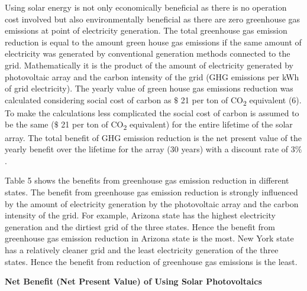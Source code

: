 \documentclass[12pt]{article}
\begin{document}


\vspace{\baselineskip}
\begin{justify}
Using solar energy is not only economically beneficial as there is no operation cost involved but also environmentally beneficial as there are zero greenhouse gas emissions at point of electricity generation. The total greenhouse gas emission reduction is equal to the amount green house gas emissions if the same amount of electricity was generated by conventional generation methods connected to the grid. Mathematically it is the product of the amount of electricity generated by photovoltaic array and the carbon intensity of the grid (GHG emissions per kWh of grid electricity). The yearly value of green house gas emissions reduction was calculated considering social cost of carbon as $\$$ 21 per ton of CO\textsubscript{2 }equivalent (6). To make the calculations less complicated the social cost of carbon is assumed to be the same ($\$$ 21 per ton of CO\textsubscript{2 }equivalent) for the entire lifetime of the solar array. The total benefit of GHG emission reduction is the net present value of the yearly benefit over the lifetime for the array (30 years) with a discount rate of 3$\%$ .
\end{justify}\par


\vspace{\baselineskip}
\begin{justify}
Table 5 shows the benefits from greenhouse gas emission reduction in different states. The benefit from greenhouse gas emission reduction is strongly influenced by the amount of electricity generation by the photovoltaic array and the carbon intensity of the grid. For example, Arizona state has the highest electricity generation and the dirtiest grid of the three states. Hence the benefit from greenhouse gas emission reduction in Arizona state is the most. New York state has a relatively cleaner grid and the least electricity generation of the three states. Hence the benefit from reduction of greenhouse gas emissions is the least.
\end{justify}\par


\vspace{\baselineskip}
\begin{justify}
\textbf{Net Benefit (Net Present Value) of Using Solar Photovoltaics}
\end{justify}\par
\end{document}
